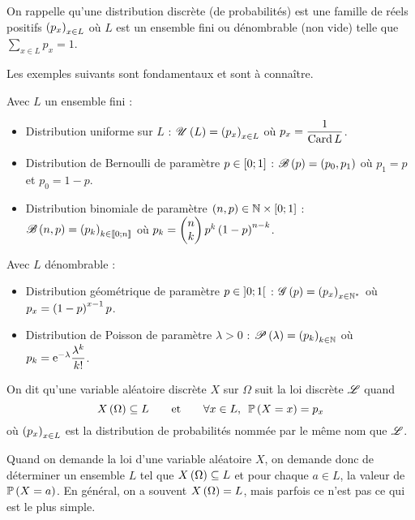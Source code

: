 On rappelle qu'une distribution discrète (de probabilités) est une famille de réels positifs \(\paren{p_x}_{x\in L}\) où \(L\) est un ensemble fini ou dénombrable (non vide) telle que \(\sum_{x\in L}p_x=1\).

Les exemples suivants sont fondamentaux et sont à connaître.

\begin{ex}
Avec \(L\) un ensemble fini :

\begin{itemize}
    \item Distribution uniforme sur \(L\) : \(\loiuniforme{L}=\paren{p_x}_{x\in L}\) où \(p_x=\dfrac{1}{\Card L}\). \\
    \item Distribution de Bernoulli de paramètre \(p\in\intervii{0}{1}\) : \(\loibernoulli{p}=\paren{p_0,p_1}\) où \(p_1=p\) et \(p_0=1-p\). \\
    \item Distribution binomiale de paramètre \(\paren{n,p}\in\N\times\intervii{0}{1}\) : \(\loibinomiale{n}{p}=\paren{p_k}_{k\in\interventierii{0}{n}}\) où \(p_k=\binom{k}{n}p^k\paren{1-p}^{n-k}\).
\end{itemize}

Avec \(L\) dénombrable :

\begin{itemize}
    \item Distribution géométrique de paramètre \(p\in\intervee{0}{1}\) : \(\loigeometrique{p}=\paren{p_x}_{x\in\Ns}\) où \(p_x=\paren{1-p}^{x-1}p\). \\
    \item Distribution de Poisson de paramètre \(\lambda>0\) : \(\loipoisson{\lambda}=\paren{p_k}_{k\in\N}\) où \(p_k=\e{-\lambda}\dfrac{\lambda^k}{k!}\).
\end{itemize}
\end{ex}

\begin{defi}
On dit qu'une variable aléatoire discrète \(X\) sur \(\Omega\) suit la loi discrète \(\fami{L}\) quand \[X\paren{\Omega}\subset L\qquad\text{et}\qquad\quantifs{\forall x\in L}\proba{X=x}=p_x\] où \(\paren{p_x}_{x\in L}\) est la distribution de probabilités nommée par le même nom que \(\fami{L}\).
\end{defi}

Quand on demande la loi d'une variable aléatoire \(X\), on demande donc de déterminer un ensemble \(L\) tel que \(X\paren{\Omega}\subset L\) et pour chaque \(a\in L\), la valeur de \(\proba{X=a}\). En général, on a souvent \(X\paren{\Omega}=L\), mais parfois ce n'est pas ce qui est le plus simple.

